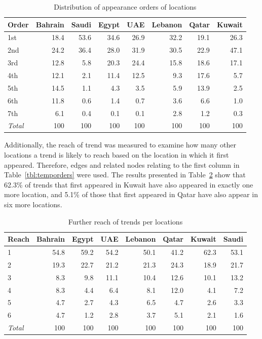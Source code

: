 \documentclass{llncs}
\begin{document}
\begin{table}[!h]
\centering
\caption{Distribution of appearance orders of locations}
\begin{tabular}{@{}lrrrrrrr@{}}
\toprule
Order & Bahrain & Saudi & Egypt & UAE & Lebanon & Qatar & Kuwait \\ 
\midrule
1st &  18.4 & 53.6 & 34.6 & 26.9 & 32.2 & 19.1 & 26.3 \\
2nd & 24.2 & 36.4 & 28.0 & 31.9 & 30.5 & 22.9 & 47.1\\
3rd &  12.8 & 5.8 & 20.3 & 24.4 & 15.8 & 18.6 &  17.1\\
4th &  12.1 & 2.1 & 11.4 & 12.5 & 9.3 & 17.6 & 5.7 \\
5th &  14.5 & 1.1 & 4.3 & 3.5 & 5.9 & 13.9 & 2.5 \\
6th &  11.8 & 0.6 & 1.4 & 0.7 & 3.6 &  6.6 & 1.0 \\
7th &  6.1 & 0.4 & 0.1 & 0.1 & 2.8 &  1.2 &  0.3\\
\midrule
{\emph{Total}} & 100 & 100 & 100 & 100 & 100 &  100 &   100\\
\bottomrule
\end{tabular}
\label{tbl:appearanceorders}
\end{table}

Additionally, the reach of trend was measured to examine how many
other locations a trend is likely to reach based on the location in which
it first appeared. Therefore, edges and related nodes relating to the
first column in Table~\ref{tbl:temporders} were used. The results
presented in Table~\ref{tbl:furtherreach} show that 62.3\% of trends
that first appeared in Kuwait have also appeared in exactly one more location,
and 5.1\% of those that first appeared in Qatar have also appear in
six more locations.

\begin{table}[!h]
\centering
\caption{Further reach of trends per locations}
\begin{tabular}{@{}lrrrrrrr@{}}
\toprule
Reach & Bahrain & Egypt & UAE & Lebanon & Qatar & Kuwait & Saudi \\ 
\midrule
1 &  54.8 & 59.2 & 54.2 & 50.1 & 41.2 & 62.3 & 53.1 \\
2 &  19.3 & 22.7 & 21.2 & 21.3 & 24.3 & 18.9 & 21.7\\
3 &    8.3 & 9.8  & 11.1 & 10.4 & 12.6 & 10.1 & 13.2\\
4 &    8.3 & 4.4 & 6.4 & 8.1 & 12.0 & 4.1 & 7.2 \\
5 &    4.7 & 2.7 & 4.3 & 6.5 & 4.7 & 2.6 & 3.3 \\
6 &    4.7 & 1.2 & 2.8 & 3.7 & 5.1 & 2.1& 1.6\\
\midrule
{\emph{Total}} & 100 & 100 & 100 & 100 & 100 &  100 &   100\\
\bottomrule
\end{tabular}
\label{tbl:furtherreach}
\end{table}
\end{document}
